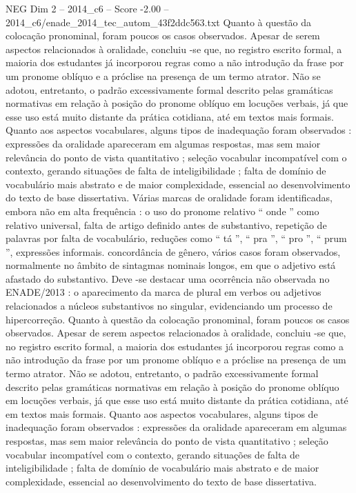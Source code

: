 \begin{textsample}{NEG Dim 2 – 2014\_c6 – Score -2.00 – 2014\_c6/enade\_2014\_tec\_autom\_43f2ddc563.txt}
Quanto à questão da colocação pronominal, foram poucos os casos observados.
Apesar de serem aspectos relacionados à oralidade, concluiu -se que, no registro escrito formal, a maioria dos estudantes já incorporou regras como a não introdução da frase por um pronome oblíquo e a próclise na presença de um termo atrator.
Não se adotou, entretanto, o padrão excessivamente formal descrito pelas gramáticas normativas em relação à posição do pronome oblíquo em locuções verbais, já que esse uso está muito distante da prática cotidiana, até em textos mais formais.
Quanto aos aspectos vocabulares, alguns tipos de inadequação foram observados : expressões da oralidade apareceram em algumas respostas, mas sem maior relevância do ponto de vista quantitativo ; seleção vocabular incompatível com o contexto, gerando situações de falta de inteligibilidade ; falta de domínio de vocabulário mais abstrato e de maior complexidade, essencial ao desenvolvimento do texto de base dissertativa.
Várias marcas de oralidade foram identificadas, embora não em alta frequência : o uso do pronome relativo “ onde ” como relativo universal, falta de artigo definido antes de substantivo, repetição de palavras por falta de vocabulário, reduções como “ tá ”, “ pra ”, “ pro ”, “ prum ”, expressões informais. concordância de gênero, vários casos foram observados, normalmente no âmbito de sintagmas nominais longos, em que o adjetivo está afastado do substantivo.
Deve -se destacar uma ocorrência não observada no ENADE/2013 : o aparecimento da marca de plural em verbos ou adjetivos relacionados a núcleos substantivos no singular, evidenciando um processo de hipercorreção.
Quanto à questão da colocação pronominal, foram poucos os casos observados.
Apesar de serem aspectos relacionados à oralidade, concluiu -se que, no registro escrito formal, a maioria dos estudantes já incorporou regras como a não introdução da frase por um pronome oblíquo e a próclise na presença de um termo atrator.
Não se adotou, entretanto, o padrão excessivamente formal descrito pelas gramáticas normativas em relação à posição do pronome oblíquo em locuções verbais, já que esse uso está muito distante da prática cotidiana, até em textos mais formais.
Quanto aos aspectos vocabulares, alguns tipos de inadequação foram observados : expressões da oralidade apareceram em algumas respostas, mas sem maior relevância do ponto de vista quantitativo ; seleção vocabular incompatível com o contexto, gerando situações de falta de inteligibilidade ; falta de domínio de vocabulário mais abstrato e de maior complexidade, essencial ao desenvolvimento do texto de base dissertativa.

\end{textsample}
